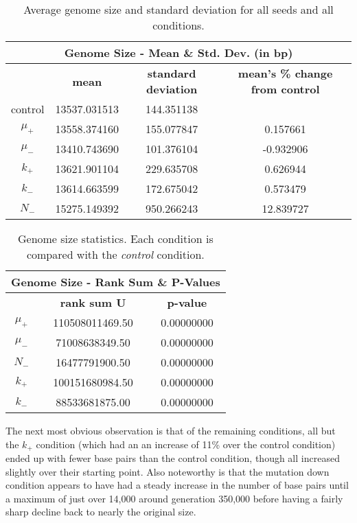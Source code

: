 \begin{table}[H]
	\begin{tabular}{|c|c|c|c|}
		\hline
		\multicolumn{4}{c}{\Large \textbf{Genome Size - Mean \& Std. Dev. (in bp)}} \\
		\hline
		 & \textbf{mean} & \textbf{standard deviation} & \textbf{mean's \% change from control} \\
		 \hline
		 control & 13537.031513 & 144.351138 & \textemdash \\ 
		 \hline
		 $\mu_+$ & 13558.374160 & 155.077847 & 0.157661 \\ 
		 \hline
		 $\mu_-$ & 13410.743690 & 101.376104 & -0.932906 \\ 
		 \hline
		 $k_+$ & 13621.901104 & 229.635708 & 0.626944 \\ 
		 \hline
		 $k_-$ & 13614.663599 & 172.675042 & 0.573479 \\ 
		 \hline
		 $N_-$ & 15275.149392 & 950.266243 & 12.839727 \\ 
		 \hline
	\end{tabular}
	\caption[Genome size - mean and std. dev.]{Average genome size and standard deviation for all seeds and all conditions. }
	\label{table:genome_size_mean_and_std_dev}
\end{table}

\begin{table}[H]
	\centering
	\begin{tabular}{|c|c|c|}
		\hline
		\multicolumn{3}{c}{\Large Genome Size - Rank Sum \& P-Values} \\
		\hline
		& \textbf{rank sum U} & \textbf{p-value} \\
		\hline \hline
		$\mu_+$ & 110508011469.50 & 0.00000000 \\ 
		\hline
		$\mu_-$ & 71008638349.50 & 0.00000000 \\ 
		\hline
		$N_-$ & 16477791900.50 & 0.00000000 \\ 
		\hline
		$k_+$ & 100151680984.50 & 0.00000000 \\ 
		\hline
		$k_-$ & 88533681875.00 & 0.00000000 \\ 
		\hline
	\end{tabular}
	\caption[Genome size statistics]{Genome size statistics. Each condition is compared with the \textit{control} condition.}
	\label{table:genome_size_stats}
\end{table} 

The next most obvious observation is that of the remaining conditions, all but the $k_+$ condition (which had an an increase of 11\% over the control condition) ended up with fewer base pairs than the control condition, though all increased slightly over their starting point. Also noteworthy is that the mutation down condition appears to have had a steady increase in the number of base pairs until a maximum of just over 14,000 around generation 350,000 before having a fairly sharp decline back to nearly the original size. 

